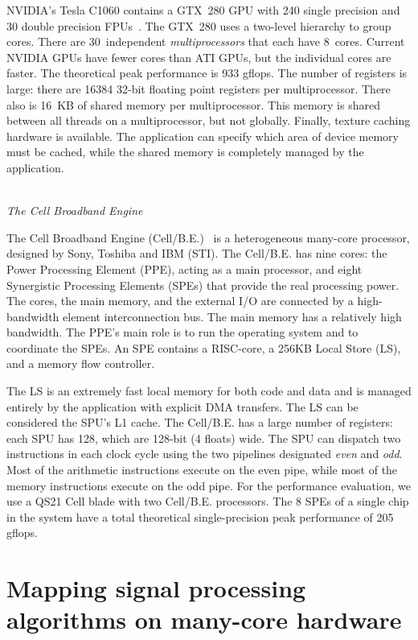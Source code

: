 \documentclass{article}
\begin{document}
\noindent NVIDIA's Tesla C1060 contains a GTX~280 GPU with 240 single precision
and 30 double precision FPUs~\cite{cuda-manual}. The GTX~280 uses a two-level hierarchy to group cores.
There are 30~independent \emph{multiprocessors\/} that each have 8~cores.
Current NVIDIA GPUs have fewer
cores than ATI GPUs, but the individual cores are faster.
The theoretical peak performance is 933 gflops.
The number of registers is large: there are 16384 32-bit floating
point registers per multiprocessor. There also is 16~KB of shared
memory per multiprocessor.  This memory is shared between all threads
on a multiprocessor, but not globally.  Finally, texture caching
hardware is available.  The application can specify which area of
device memory must be cached, while the shared memory is completely
managed by the application.



\noindent \\ \emph{The Cell Broadband Engine}

\noindent The Cell Broadband Engine (\mbox{Cell/B.E.})~\cite{cell} is a
heterogeneous many-core processor, designed by Sony, Toshiba and IBM
(STI).  The \mbox{Cell/B.E.} has nine cores: the Power Processing
Element (PPE), acting as a main processor, and eight Synergistic
Processing Elements (SPEs) that provide the real processing power.
The cores, the main memory, and the external I/O are connected by a
high-bandwidth element interconnection bus.  The main memory has
a relatively high bandwidth.  The PPE's main role is to
run the operating system and to coordinate the SPEs.  An SPE contains
a RISC-core, a 256KB Local Store (LS), and a memory flow controller.

The LS is an extremely fast local memory for both code and data
and is managed entirely by the application with explicit DMA
transfers.  The LS can be considered the SPU's L1 cache.  The
\mbox{Cell/B.E.} has a large number of registers: each SPU has 128,
which are 128-bit (4 floats) wide.  The SPU can dispatch two
instructions in each clock cycle using the two pipelines designated
\emph{even} and \emph{odd}. Most of the arithmetic instructions
execute on the even pipe, while most of the memory instructions
execute on the odd pipe.  For the performance evaluation, we use a QS21 Cell blade with two
\mbox{Cell/B.E.} processors.  The 8 SPEs of a single chip in the
system have a total theoretical single-precision peak performance of
205 gflops.


\section{Mapping signal processing algorithms on many-core hardware}
\end{document}
